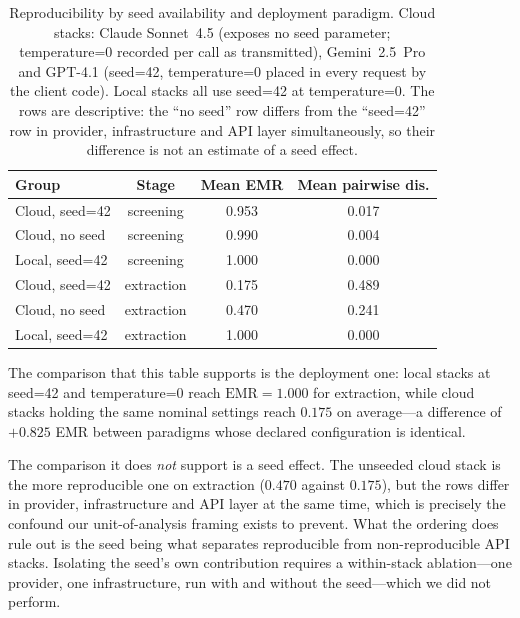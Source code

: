 \documentclass[11pt]{article}
\newenvironment{fittab}{\begin{lrbox}{\fittabbox}}{\end{lrbox}%
  \ifdim\wd\fittabbox>\linewidth\resizebox{\linewidth}{!}{\usebox{\fittabbox}}\else\usebox{\fittabbox}\fi}
\begin{document}
\begin{table}[htbp]
\centering
\caption{Reproducibility by seed availability and deployment paradigm. Cloud stacks: Claude Sonnet~4.5 (exposes no seed parameter; temperature=0 recorded per call as transmitted), Gemini~2.5~Pro and GPT-4.1 (seed=42, temperature=0 placed in every request by the client code). Local stacks all use seed=42 at temperature=0. The rows are descriptive: the ``no seed'' row differs from the ``seed=42'' row in provider, infrastructure and API layer simultaneously, so their difference is not an estimate of a seed effect.}
\label{tab:seed}
\begin{fittab}\begin{tabular}{lccc}
\toprule
\textbf{Group} & \textbf{Stage} & \textbf{Mean EMR} & \textbf{Mean pairwise dis.} \\
\midrule
Cloud, seed=42       & screening  & 0.953 & 0.017 \\
Cloud, no seed       & screening  & 0.990 & 0.004 \\
Local, seed=42       & screening  & 1.000 & 0.000 \\
\midrule
Cloud, seed=42       & extraction & 0.175 & 0.489 \\
Cloud, no seed       & extraction & 0.470 & 0.241 \\
Local, seed=42       & extraction & 1.000 & 0.000 \\
\bottomrule
\end{tabular}\end{fittab}
\end{table}

\noindent The comparison that this table supports is the deployment one: local stacks at seed=42 and temperature=0 reach $\textrm{EMR}{=}1.000$ for extraction, while cloud stacks holding the same nominal settings reach $0.175$ on average---a difference of $+0.825$ EMR between paradigms whose declared configuration is identical.

\noindent The comparison it does \emph{not} support is a seed effect. The unseeded cloud stack is the more reproducible one on extraction ($0.470$ against $0.175$), but the rows differ in provider, infrastructure and API layer at the same time, which is precisely the confound our unit-of-analysis framing exists to prevent. What the ordering does rule out is the seed being what separates reproducible from non-reproducible API stacks. Isolating the seed's own contribution requires a within-stack ablation---one provider, one infrastructure, run with and without the seed---which we did not perform.
\end{document}
